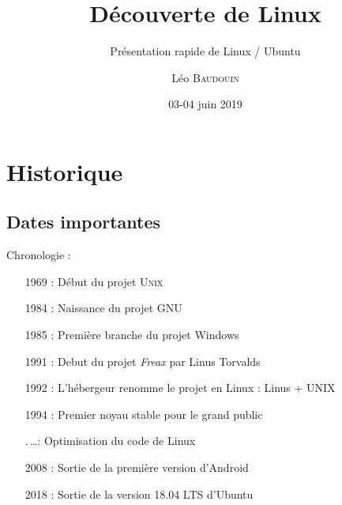 \documentclass{beamer}
\title[Pr\'esentation Linux]{D\'ecouverte de Linux}
\subtitle{Présentation rapide de Linux / Ubuntu}
\author{L\'eo \textsc{Baudouin}}
\institute{
  {\url{baudouin.leo @ gmail.com}}
}
\date{03-04 juin 2019}
\begin{document}
\begin{frame}
\titlepage
\end{frame}

\begin{frame}
\tableofcontents
\end{frame}


\section{Historique}
\subsection{Dates importantes}
\begin{frame}
  \begin{block}{Chronologie :}
   ~~~~\begin{minipage}{\linewidth}
      \begin{itemize}
      \item[1969 :] Début du projet U\textsc{nix}
      \item[1984 :] Naissance du projet GNU
      \item[1985 :] Première branche du projet Windows
      \item[1991 :] Debut du projet \textit{Freax} par Linus Torvalds
      \item[1992 :] L'h\'ebergeur renomme le projet en Linux : Linus + UNIX
      \item[1994 :] Premier noyau stable pour le grand public
      \item[.\,\dots :] Optimisation du code de Linux
      \item[2008 :] Sortie de la première version d'Android
      \item[2018 :] Sortie de la version 18.04 LTS d'Ubuntu
      \end{itemize}
    \end{minipage}
  \end{block}
\end{frame}
\end{document}
